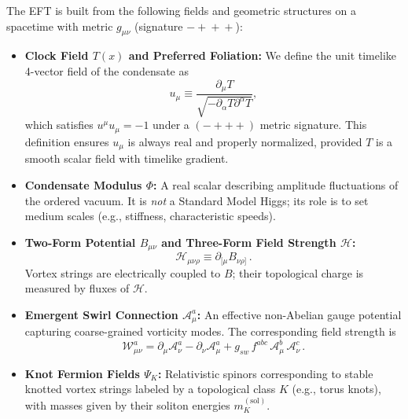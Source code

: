 \documentclass[12pt]{article}
\begin{document}
    The EFT is built from the following fields and geometric structures on a spacetime with metric $g_{\mu\nu}$ (signature $-\!+\!+\!+$):
    \begin{itemize}
        \item \textbf{Clock Field $T(x)$ and Preferred Foliation:} We define the unit timelike 4-vector field of the condensate as
        \begin{equation}
            u_{\mu} \equiv \frac{\partial_{\mu}T}{\sqrt{-\partial_{\alpha}T \partial^{\alpha}T}},
        \end{equation}
        which satisfies $u^\mu u_\mu = -1$ under a $(-+++)$ metric signature. This definition ensures $u_\mu$ is always real and properly normalized, provided $T$ is a smooth scalar field with timelike gradient.


        \item \textbf{Condensate Modulus $\Phi$:} A real scalar describing amplitude fluctuations of the ordered vacuum. It is \emph{not} a Standard Model Higgs; its role is to set medium scales (e.g., stiffness, characteristic speeds).

        \item \textbf{Two-Form Potential $B_{\mu\nu}$ and Three-Form Field Strength $\mathcal{H}$:}
        \begin{equation}
            \mathcal{H}_{\mu\nu\rho} \equiv \partial_{[\mu} B_{\nu\rho]}\,.
        \end{equation}
        Vortex strings are electrically coupled to $B$; their topological charge is measured by fluxes of $\mathcal{H}$.

        \item \textbf{Emergent Swirl Connection $\mathcal{A}_\mu^a$:} An effective non-Abelian gauge potential capturing coarse-grained vorticity modes. The corresponding field strength is
        \begin{equation}
            \mathcal{W}_{\mu\nu}^a = \partial_\mu \mathcal{A}_\nu^a - \partial_\nu \mathcal{A}_\mu^a + g_{\!sw}\, f^{abc}\,\mathcal{A}_\mu^b\,\mathcal{A}_\nu^c\,.
        \end{equation}

        \item \textbf{Knot Fermion Fields $\Psi_K$:} Relativistic spinors corresponding to stable knotted vortex strings labeled by a topological class $K$ (e.g., torus knots), with masses given by their soliton energies $m_K^{(\mathrm{sol})}$.
    \end{itemize}
\end{document}
